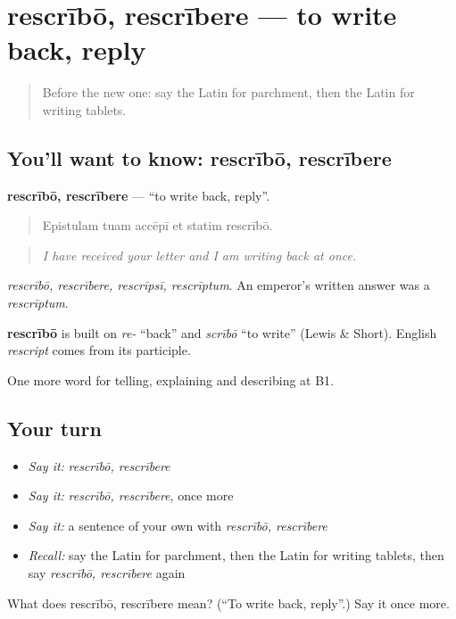 \section[rescrībō, rescrībere]{rescrībō, rescrībere — to write back, reply}

\label{lesson:LA-C551-rescribo}



\begin{quote}
Before the new one: say the Latin for parchment, then the Latin for writing tablets.
\end{quote}

\subsection*{You'll want to know: rescrībō, rescrībere}
\textbf{rescrībō, rescrībere} — \textquotedblleft{}to write back, reply\textquotedblright{}.

\begin{quote}
Epistulam tuam accēpī et statim rescrībō.
\end{quote}

\begin{quote}
\emph{I have received your letter and I am writing back at once.}
\end{quote}

\emph{rescrībō, rescrībere, rescrīpsī, rescrīptum}. An emperor's written answer was a \emph{rescrīptum}.

\begin{cousinweb}
\textbf{rescrībō} is built on \emph{re-} \textquotedblleft{}back\textquotedblright{} and \emph{scrībō} \textquotedblleft{}to write\textquotedblright{} (Lewis \& Short). English \emph{rescript} comes from its participle.
\end{cousinweb}

\begin{grammarlens}[title={What you've built}]
One more word for telling, explaining and describing at B1.
\end{grammarlens}

\subsection*{Your turn}
\begin{itemize}
\raggedright
  \item \emph{Say it:} \emph{rescrībō, rescrībere}
  \item \emph{Say it:} \emph{rescrībō, rescrībere}, once more
  \item \emph{Say it:} a sentence of your own with \emph{rescrībō, rescrībere}
  \item \emph{Recall:} say the Latin for parchment, then the Latin for writing tablets, then say \emph{rescrībō, rescrībere} again
\end{itemize}

\begin{tcolorbox}[breakable,colback=teal!4,colframe=teal!35!black,title={Before you move on}]
What does rescrībō, rescrībere mean? (\textquotedblleft{}To write back, reply\textquotedblright{}.) Say it once more.
\end{tcolorbox}
